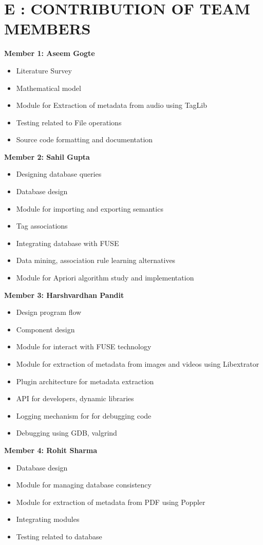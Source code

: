 {}
\chapter*{E : CONTRIBUTION OF TEAM MEMBERS} 
\noindent \textbf{Member 1: Aseem Gogte} 
\begin{itemize}
\item Literature Survey
\item Mathematical model
\item Module for Extraction of metadata from audio using TagLib
\item Testing related to File operations
\item Source code formatting and documentation
\end{itemize}

\noindent \textbf{Member 2: Sahil Gupta}
\begin{itemize}
\item Designing database queries
\item Database design
\item Module for importing and exporting semantics
\item Tag associations
\item Integrating database with FUSE
\item Data mining, association rule learning alternatives
\item Module for Apriori algorithm study and implementation
\end{itemize}

\noindent \textbf {Member 3: Harshvardhan Pandit} 
\begin{itemize}
\item Design program flow
\item Component design
\item Module for interact with FUSE technology
\item Module for extraction of metadata from images and videos using Libextrator
\item Plugin architecture for metadata extraction
\item API for developers, dynamic libraries
\item Logging mechanism for for debugging code
\item Debugging using GDB, valgrind
\end{itemize}

\noindent \textbf {Member 4: Rohit Sharma} 
\begin{itemize}
\item Database design
\item Module for managing database consistency
\item Module for extraction of metadata from PDF using Poppler
\item Integrating modules
\item Testing related to database 
\end{itemize}

